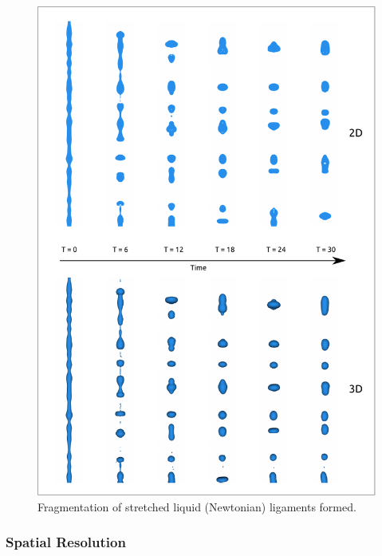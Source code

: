 \begin{figure}
\centering
\includegraphics{plots/ligament_breakup/3d_vs_2d_long.pdf}
\caption{Fragmentation of stretched liquid (Newtonian) ligaments formed. 
	}
\label{2d_3d_long}
\end{figure}
\subsubsection*{Spatial Resolution}


